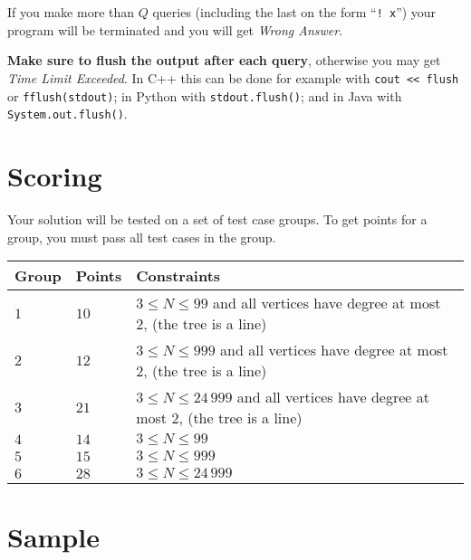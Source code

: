 If you make more than $Q$ queries (including the last on the form ``\verb|! x|'')
your program will be terminated and you will get \textit{Wrong Answer}.

\textbf{Make sure to flush the output after each query}, otherwise you may get \textit{Time Limit Exceeded}.
In C++ this can be done for example with \texttt{cout << flush}
or \texttt{fflush(stdout)};
in Python with \texttt{stdout.flush()};
and in Java with \texttt{System.out.flush()}.

\section*{Scoring}
Your solution will be tested on a set of test case groups.
To get points for a group, you must pass all test cases in the group.


\noindent
\begin{tabular}{| l | l | l |}
  \hline
  Group & Points & Constraints \\ \hline
  $1$   & $10$        & $3 \le N\le 99$ and all vertices have degree at most 2, (the tree is a line) \\ \hline
  $2$   & $12$        & $3 \le N\le 999$ and all vertices have degree at most 2, (the tree is a line) \\ \hline
  $3$   & $21$        & $3 \le N\le 24\,999$ and all vertices have degree at most 2, (the tree is a line) \\ \hline \hline
  $4$   & $14$        & $3 \le N\le 99$ \\ \hline
  $5$   & $15$        & $3 \le N\le 999$ \\ \hline
  $6$   & $28$        & $3 \le N\le 24\,999$ \\ \hline
\end{tabular}

\section*{Sample}

